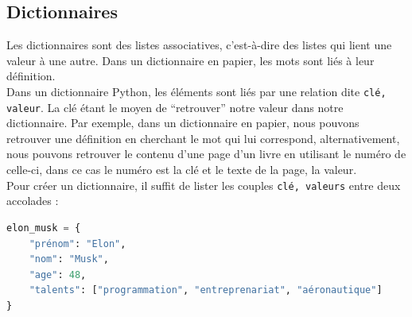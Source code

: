 	\subsection{Dictionnaires}
	Les dictionnaires sont des listes associatives, c’est-à-dire des listes qui lient une valeur à une autre. Dans un dictionnaire en papier, les mots sont liés à leur définition. \\
	
	Dans un dictionnaire Python, les éléments sont liés par une relation dite \lstinline{clé, valeur}. La clé étant le moyen de “retrouver” notre valeur dans notre dictionnaire. Par exemple, dans un dictionnaire en papier, nous pouvons retrouver une définition en cherchant le mot qui lui correspond, alternativement, nous pouvons retrouver le contenu d’une page d’un livre en utilisant le numéro de celle-ci, dans ce cas le numéro est la clé et le texte de la page, la valeur. \\
	
	Pour créer un dictionnaire, il suffit de lister les couples \lstinline{clé, valeurs} entre
    deux accolades : \\
	
	 \begin{lstlisting}[language=Python]
elon_musk = {
    "prénom": "Elon",
    "nom": "Musk",
    "age": 48,
    "talents": ["programmation", "entreprenariat", "aéronautique"]
}   
        \end{lstlisting}
				
